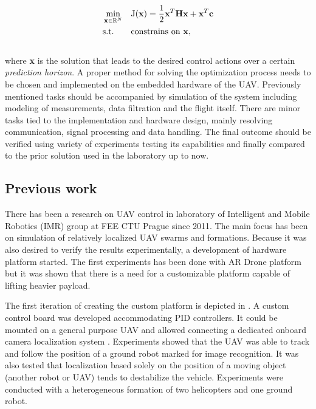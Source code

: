 \begin{equation}
\label{eq:qmpc_intro}
\begin{aligned}
& \min_{\textbf{x} \in \mathbb{R}^{N}}
& & \mathrm{J}(\textbf{x}) = \frac{1}{2}\textbf{x}^T\textbf{H}\textbf{x} + \textbf{x}^T\textbf{c}\\
& \text{s.t.}
& & \text{constrains on \textbf{x}},
\end{aligned}
\end{equation}
\\
where \textbf{x} is the solution that leads to the desired control actions over a certain \emph{prediction horizon}. A proper method for solving the optimization process needs to be chosen and implemented on the embedded hardware of the UAV. Previously mentioned tasks should be accompanied by simulation of the system including modeling of measurements, data filtration and the flight itself. There are minor tasks tied to the implementation and hardware design, mainly resolving communication, signal processing and data handling. The final outcome should be verified using variety of experiments testing its capabilities and finally compared to the prior solution used in the laboratory up to now.

\subsection{Previous work}
\label{cap:prior_work}

There has been a research on UAV control in laboratory of Intelligent and Mobile Robotics (IMR) group at FEE CTU Prague since 2011. The main focus has been on simulation of relatively localized UAV swarms and formations. Because it was also desired to verify the results experimentally, a development of hardware platform started. The first experiments has been done with AR Drone platform \citep{kranik2012drone} but it was shown that there is a need for a customizable platform capable of lifting heavier payload.

The first iteration of creating the custom platform is depicted in \citep{baca2013}. A custom control board was developed accommodating PID controllers. It could be mounted on a general purpose UAV and allowed connecting a dedicated onboard camera localization system \citep{faigl2013whycon}. Experiments showed that the UAV was able to track and follow the position of a ground robot marked for image recognition. It was also tested that localization based solely on the position of a moving object (another robot or UAV) tends to destabilize the vehicle. Experiments were conducted with a heterogeneous formation of two helicopters and one ground robot.

